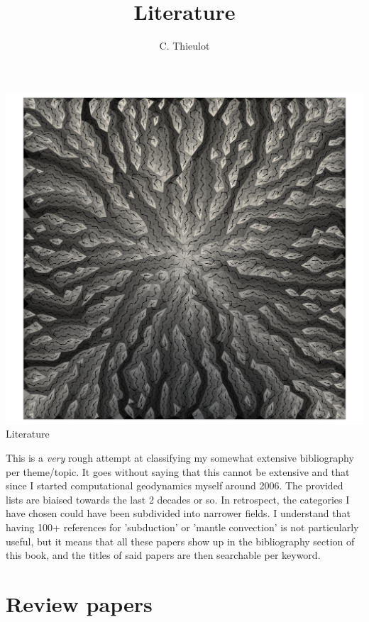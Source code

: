 \documentclass[a4paper,12pt]{report}
\title{Literature}
\author{C. Thieulot}
\begin{document}
\thispagestyle{empty}

\begin{center}
\includegraphics[width=0.96\linewidth]{images/frontpage/pretty6.png}\\
{\large Literature}
\end{center}

\newpage

\tableofcontents

\newpage
This is a {\it very} rough attempt at classifying my somewhat extensive 
bibliography per theme/topic.
It goes without saying that this cannot be extensive and that since I 
started computational geodynamics myself around 2006. 
The provided lists are biaised towards the last 2 decades or so. 
In retrospect, the categories I have chosen could have been subdivided
into narrower fields. I understand that having 100+ references 
for 'subduction'  or 'mantle convection' is not particularly useful, 
but it means that all these papers show up in the bibliography section 
of this book, and the titles of said papers are then searchable per keyword.

\chapter{Review papers} 
\end{document}
